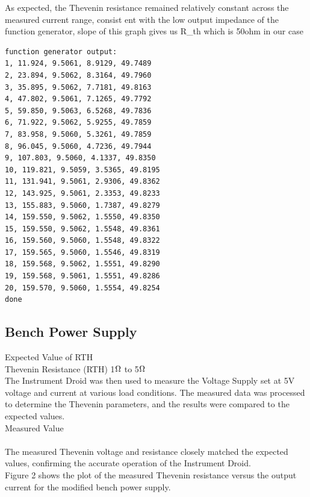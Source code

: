 \documentclass[a4paper,11pt]{article}%
\begin{document}
As expected, the Thevenin resistance remained relatively constant across the measured current range, consist  ent with the low output impedance of the function generator, slope of this graph gives us R\_th which is 50ohm in our case

\begin{lstlisting}
function generator output:
1, 11.924, 9.5061, 8.9129, 49.7489 
2, 23.894, 9.5062, 8.3164, 49.7960 
3, 35.895, 9.5062, 7.7181, 49.8163 
4, 47.802, 9.5061, 7.1265, 49.7792 
5, 59.850, 9.5063, 6.5268, 49.7836 
6, 71.922, 9.5062, 5.9255, 49.7859 
7, 83.958, 9.5060, 5.3261, 49.7859 
8, 96.045, 9.5060, 4.7236, 49.7944 
9, 107.803, 9.5060, 4.1337, 49.8350 
10, 119.821, 9.5059, 3.5365, 49.8195 
11, 131.941, 9.5061, 2.9306, 49.8362 
12, 143.925, 9.5061, 2.3353, 49.8233 
13, 155.883, 9.5060, 1.7387, 49.8279 
14, 159.550, 9.5062, 1.5550, 49.8350 
15, 159.550, 9.5062, 1.5548, 49.8361 
16, 159.560, 9.5060, 1.5548, 49.8322 
17, 159.565, 9.5060, 1.5546, 49.8319 
18, 159.568, 9.5062, 1.5551, 49.8290 
19, 159.568, 9.5061, 1.5551, 49.8286 
20, 159.570, 9.5060, 1.5554, 49.8254 
done
\end{lstlisting}





\subsection{Bench Power Supply} 

Expected Value	of RTH \\
Thevenin Resistance (RTH)		1$\ohm$ to 5$\ohm$ \\

The Instrument Droid was then used to measure the Voltage Supply set at 5V  voltage and current at various load conditions. The measured data was processed to determine the Thevenin parameters, and the results were compared to the expected values.\\


Measured Value\\
\\
The measured Thevenin voltage and resistance closely matched the expected values, confirming the accurate operation of the Instrument Droid.\\


Figure 2 shows the plot of the measured Thevenin resistance versus the output current for the modified bench power supply.\\
\end{document}

